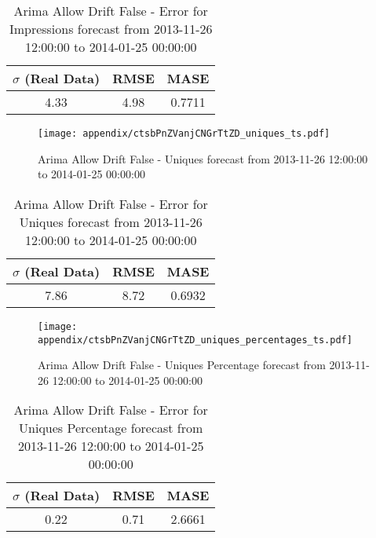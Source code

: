 \begin{table}[H]
\centering
\footnotesize
\begin{tabular}{ccc}
$\sigma$ (Real Data) & RMSE & MASE   \\ \hline
4.33 & 4.98 & 0.7711 \\
\end{tabular}

\vspace{0.5cm}

\caption[]{
Arima Allow Drift False - Error for Impressions forecast from 2013-11-26 12:00:00 to 2014-01-25 00:00:00}
\end{table}

\begin{figure}[H] \begin{center} \leavevmode
\texttt{[image: appendix/ctsbPnZVanjCNGrTtZD\_uniques\_ts.pdf]} \caption[]{
Arima Allow Drift False - Uniques forecast from 2013-11-26 12:00:00 to 2014-01-25 00:00:00} \label{fig:appendix/ctsbPnZVanjCNGrTtZD_uniques_ts.pdf} \end{center}
\end{figure}

\begin{table}[H]
\centering
\footnotesize
\begin{tabular}{ccc}
$\sigma$ (Real Data) & RMSE & MASE   \\ \hline
7.86 & 8.72 & 0.6932 \\
\end{tabular}

\vspace{0.5cm}

\caption[]{
Arima Allow Drift False - Error for Uniques forecast from 2013-11-26 12:00:00 to 2014-01-25 00:00:00}
\end{table}

\begin{figure}[H] \begin{center} \leavevmode
\texttt{[image: appendix/ctsbPnZVanjCNGrTtZD\_uniques\_percentages\_ts.pdf]} \caption[]{
Arima Allow Drift False - Uniques Percentage forecast from 2013-11-26 12:00:00 to 2014-01-25 00:00:00} \label{fig:appendix/ctsbPnZVanjCNGrTtZD_uniques_percentages_ts.pdf} \end{center}
\end{figure}

\begin{table}[H]
\centering
\footnotesize
\begin{tabular}{ccc}
$\sigma$ (Real Data) & RMSE & MASE   \\ \hline
0.22 & 0.71 & 2.6661 \\
\end{tabular}

\vspace{0.5cm}

\caption[]{
Arima Allow Drift False - Error for Uniques Percentage forecast from 2013-11-26 12:00:00 to 2014-01-25 00:00:00}
\end{table}

